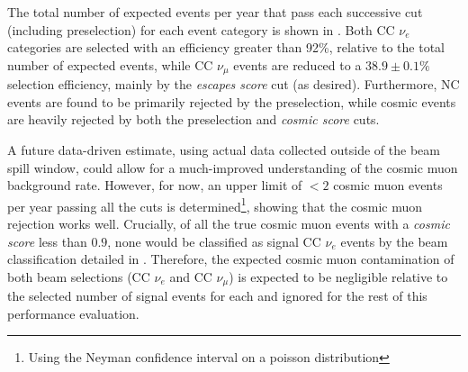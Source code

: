 The total number of expected events per year that pass each successive cut (including
preselection) for each event category is shown in . Both CC $\nu_{e}$
categories are selected with an efficiency greater than 92\%, relative to the total number of
expected events, while CC $\nu_{\mu}$ events are reduced to a $38.9\pm0.1\%$ selection efficiency,
mainly by the \emph{escapes score} cut (as desired). Furthermore, NC events are found to be
primarily rejected by the preselection, while cosmic events are heavily rejected by both the
preselection and \emph{cosmic score} cuts.

A future data-driven estimate, using actual \chipsfive data collected outside of the \numi beam
spill window, could allow for a much-improved understanding of the cosmic muon background rate.
However, for now, an upper limit of $<2$ cosmic muon events per year passing all the cuts is
determined\footnote{Using the Neyman confidence interval on a poisson distribution}, showing that
the cosmic muon rejection works well. Crucially, of all the true cosmic muon events with a
\emph{cosmic score} less than $0.9$, none would be classified as signal CC $\nu_{e}$ events by the
beam classification detailed in . Therefore, the expected cosmic
muon contamination of both beam selections (CC $\nu_{e}$ and  CC $\nu_{\mu}$) is expected to be
negligible relative to the selected number of signal events for each and ignored for the rest of
this performance evaluation.

